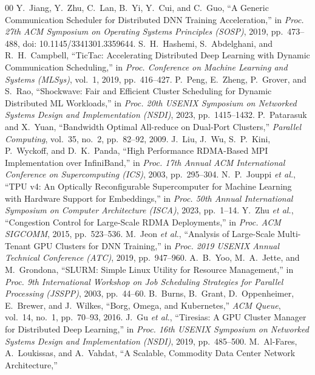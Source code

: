 \documentclass[conference]{IEEEtran}
\begin{document}
\begin{thebibliography}{00}
Y.~Jiang, Y.~Zhu, C.~Lan, B.~Yi, Y.~Cui, and C.~Guo,
``A Generic Communication Scheduler for Distributed DNN Training Acceleration,''
in \emph{Proc. 27th ACM Symposium on Operating Systems Principles (SOSP)}, 2019, pp.~473--488,
doi: 10.1145/3341301.3359644.
S.~H.~Hashemi, S.~Abdelghani, and R.~H.~Campbell,
``TicTac: Accelerating Distributed Deep Learning with Dynamic Communication Scheduling,''
in \emph{Proc. Conference on Machine Learning and Systems (MLSys)}, vol.~1, 2019, pp.~416--427.
P.~Peng, E.~Zheng, P.~Grover, and S.~Rao,
``Shockwave: Fair and Efficient Cluster Scheduling for Dynamic Distributed ML Workloads,''
in \emph{Proc. 20th USENIX Symposium on Networked Systems Design and Implementation (NSDI)}, 2023, pp.~1415--1432.
P.~Patarasuk and X.~Yuan,
``Bandwidth Optimal All-reduce on Dual-Port Clusters,''
\emph{Parallel Computing}, vol.~35, no.~2, pp.~82--92, 2009.
J.~Liu, J.~Wu, S.~P.~Kini, P.~Wyckoff, and D.~K.~Panda,
``High Performance RDMA-Based MPI Implementation over InfiniBand,''
in \emph{Proc. 17th Annual ACM International Conference on Supercomputing (ICS)}, 2003, pp.~295--304.
N.~P.~Jouppi \emph{et al.},
``TPU v4: An Optically Reconfigurable Supercomputer for Machine Learning with Hardware Support for Embeddings,''
in \emph{Proc. 50th Annual International Symposium on Computer Architecture (ISCA)}, 2023, pp.~1--14.
Y.~Zhu \emph{et al.},
``Congestion Control for Large-Scale RDMA Deployments,''
in \emph{Proc. ACM SIGCOMM}, 2015, pp.~523--536.
M.~Jeon \emph{et al.},
``Analysis of Large-Scale Multi-Tenant GPU Clusters for DNN Training,''
in \emph{Proc. 2019 USENIX Annual Technical Conference (ATC)}, 2019, pp.~947--960.
A.~B.~Yoo, M.~A.~Jette, and M.~Grondona,
``SLURM: Simple Linux Utility for Resource Management,''
in \emph{Proc. 9th International Workshop on Job Scheduling Strategies for Parallel Processing (JSSPP)}, 2003, pp.~44--60.
B.~Burns, B.~Grant, D.~Oppenheimer, E.~Brewer, and J.~Wilkes,
``Borg, Omega, and Kubernetes,''
\emph{ACM Queue}, vol.~14, no.~1, pp.~70--93, 2016.
J.~Gu \emph{et al.},
``Tiresias: A GPU Cluster Manager for Distributed Deep Learning,''
in \emph{Proc. 16th USENIX Symposium on Networked Systems Design and Implementation (NSDI)}, 2019, pp.~485--500.
M.~Al-Fares, A.~Loukissas, and A.~Vahdat,
``A Scalable, Commodity Data Center Network Architecture,''

\end{thebibliography}
\end{document}
